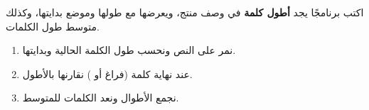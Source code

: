 \begin{statement}
اكتب برنامجًا يجد \textbf{أطول كلمة} في وصف منتج، ويعرضها مع طولها وموضع بدايتها، وكذلك متوسط طول الكلمات.
\end{statement}
\begin{stepsbox}\begin{enumerate}
\item نمر على النص ونحسب طول الكلمة الحالية  وبدايتها.
\item عند نهاية كلمة (فراغ أو ) نقارنها بالأطول.
\item نجمع الأطوال ونعد الكلمات للمتوسط.
\end{enumerate}\end{stepsbox}
